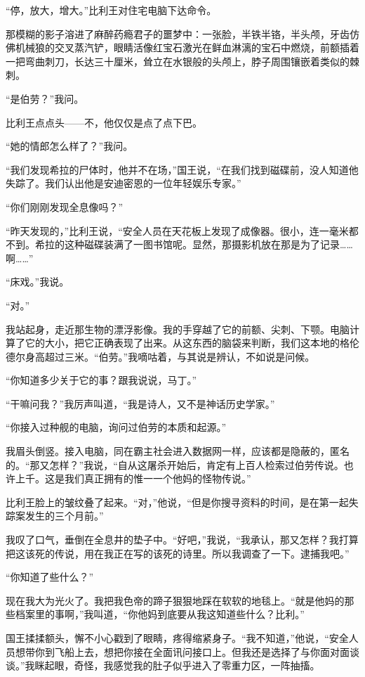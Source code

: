 \documentclass[AutoFakeBold=true]{book}
\begin{document}
``停，放大，增大。''比利王对住宅电脑下达命令。

那模糊的影子溶进了麻醉药瘾君子的噩梦中：一张脸，半铁半铬，半头颅，牙齿仿佛机械狼的交叉蒸汽铲，眼睛活像红宝石激光在鲜血淋漓的宝石中燃烧，前额插着一把弯曲刺刀，长达三十厘米，耸立在水银般的头颅上，脖子周围镶嵌着类似的棘刺。

``是伯劳？''我问。

比利王点点头——不，他仅仅是点了点下巴。

``她的情郎怎么样了？''我问。

``我们发现希拉的尸体时，他并不在场，''国王说，``在我们找到磁碟前，没人知道他失踪了。我们认出他是安迪密恩的一位年轻娱乐专家。''

``你们刚刚发现全息像吗？''

``昨天发现的，''比利王说，``安全人员在天花板上发现了成像器。很小，连一毫米都不到。希拉的这种磁碟装满了一图书馆呢。显然，那摄影机放在那是为了记录……啊……''

``床戏。''我说。

``对。''

我站起身，走近那生物的漂浮影像。我的手穿越了它的前额、尖刺、下颚。电脑计算了它的大小，把它正确表现了出来。从这东西的脑袋来判断，我们这本地的格伦德尔身高超过三米。``伯劳。''我嘀咕着，与其说是辨认，不如说是问候。

``你知道多少关于它的事？跟我说说，马丁。''

``干嘛问我？''我厉声叫道，``我是诗人，又不是神话历史学家。''

``你接入过种舰的电脑，询问过伯劳的本质和起源。''

我眉头倒竖。接入电脑，同在霸主社会进入数据网一样，应该都是隐蔽的，匿名的。``那又怎样？''我说，``自从这屠杀开始后，肯定有上百人检索过伯劳传说。也许上千。这是我们真正拥有的惟一一个他妈的怪物传说。''

比利王脸上的皱纹叠了起来。``对，''他说，``但是你搜寻资料的时间，是在第一起失踪案发生的三个月前。''

我叹了口气，垂倒在全息井的垫子中。``好吧，''我说，``我承认，那又怎样？我打算把这该死的传说，用在我正在写的该死的诗里。所以我调查了一下。逮捕我吧。''

``你知道了些什么？''

现在我大为光火了。我把我色帝的蹄子狠狠地踩在软软的地毯上。``就是他妈的那些档案里的事啊，''我叫道，``你他妈到底要从我这知道些什么？比利。''

国王揉揉额头，懈不小心戳到了眼睛，疼得缩紧身子。``我不知道，''他说，``安全人员想带你到飞船上去，想把你接在全面讯问接口上。但我还是选择了与你面对面谈谈。''我眯起眼，奇怪，我感觉我的肚子似乎进入了零重力区，一阵抽搐。
\end{document}
